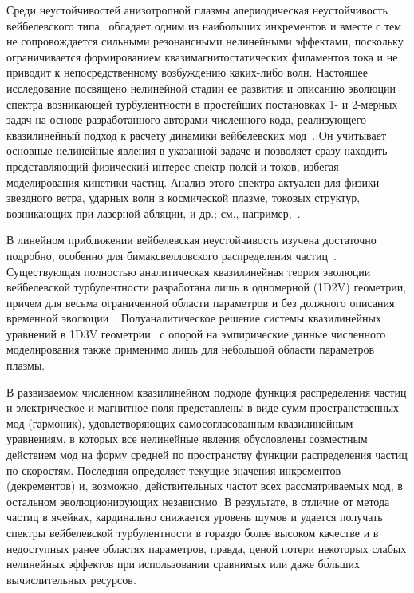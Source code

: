 Среди неустойчивостей анизотропной плазмы апериодическая неустойчивость вейбелевского типа~\cite{Weibel1959,Zhou2022,Fried1959,Kalman1968,Morse1971,Kocharovsky2016,Lazar2006,Stockem2009,SchaeferRolffs2006} обладает одним из наибольших инкрементов и вместе с тем не сопровождается сильными резонансными нелинейными эффектами, поскольку ограничивается формированием квазимагнитостатических филаментов тока и не приводит к непосредственному возбуждению каких-либо волн. Настоящее исследование посвящено нелинейной стадии ее развития и описанию эволюции спектра возникающей турбулентности в простейших постановках 1- и 2-мерных задач на основе разработанного авторами численного кода, реализующего квазилинейный подход к расчету динамики вейбелевских мод~\cite{Kuznetsov2022}. Он учитывает основные нелинейные явления в указанной задаче и позволяет сразу находить представляющий физический интерес спектр полей и токов, избегая моделирования кинетики частиц. Анализ этого спектра актуален для физики звездного ветра, ударных волн в космической плазме, токовых структур, возникающих при лазерной абляции, и др.; см., например,~\cite{Lazar2022,Romanov2004,Medvedev2005,Chatterjee2017}.

В линейном приближении вейбелевская неустойчивость изучена достаточно подробно, особенно для бимаксвелловского распределения частиц~\cite{Weibel1959,Fried1959,Vagin2014}. Существующая полностью аналитическая квазилинейная теория эволюции вейбелевской турбулентности разработана лишь в одномерной (1D2V) геометрии, причем для весьма ограниченной области параметров и без должного описания временной эволюции~\cite{Pokhotelov2011}. Полуаналитическое решение системы квазилинейных уравнений в 1D3V геометрии~\cite{Ruyer2015} с опорой на эмпирические данные численного моделирования также применимо лишь для небольшой области параметров плазмы. 

В развиваемом численном квазилинейном подходе функция распределения частиц и электрическое и магнитное поля представлены в виде сумм пространственных мод (гармоник), удовлетворяющих самосогласованным квазилинейным уравнениям, в которых все нелинейные явления обусловлены совместным действием мод на форму средней по пространству функции распределения частиц по скоростям. Последняя определяет текущие значения инкрементов (декрементов) и, возможно, действительных частот всех рассматриваемых мод, в остальном эволюционирующих независимо. В результате, в отличие от метода частиц в ячейках, кардинально снижается уровень шумов и удается получать спектры вейбелевской турбулентности в гораздо более высоком качестве и в недоступных ранее областях параметров, правда, ценой потери некоторых слабых нелинейных эффектов при использовании сравнимых или даже б\'{о}льших вычислительных ресурсов.

